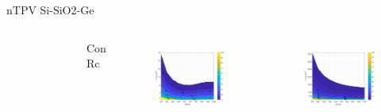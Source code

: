 \documentclass[spanish,a4paper]{beamer}%
\begin{document}
\begin{frame}{nTPV Si-SiO2-Ge}
{\begin{columns}
\begin{minipage}[r]{.9\columnwidth}
\begin{figure}[h]
								\label{fig:SiSiO2Ge_relfull}%
						\end{figure}
						\end{minipage}
						\hfill \vfill
					\vspace{-10pt}
						\begin{block}{\centering Con Rc}
							\end{block}
					\vspace{0pt}
					\begin{minipage}[c]{.9\columnwidth}
						\begin{figure}[h]%
								\centering
										\includegraphics[width=0.81\columnwidth]{SiGe_Rc}%
								\label{fig:SiSiO2Ge_relRc}%
						\end{figure}
						\end{minipage}
						\hfill \vfill
						\begin{minipage}[c]{.9\columnwidth}
						\begin{figure}[h]%
								\centering
										\includegraphics[width=0.81\columnwidth]{SiGe_Rc_full}
								\label{fig:SiSiO2Ge_relfullRc}%
						\end{figure}
						\end{minipage}
				\end{columns}		
		}
	\end{frame}
	
\end{document}
